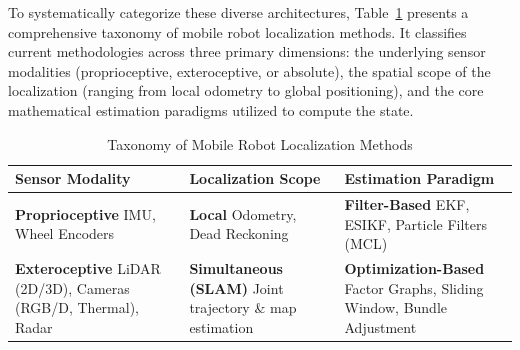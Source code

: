 \documentclass[pdflatex,sn-mathphys-num]{sn-jnl}
\theoremstyle{thmstyleone}%
\theoremstyle{thmstyletwo}%
\theoremstyle{thmstylethree}%
\begin{document}
To systematically categorize these diverse architectures, Table~\ref{classification-localization-methods} presents a comprehensive taxonomy of mobile robot localization methods. It classifies current methodologies across three primary dimensions: the underlying sensor modalities (proprioceptive, exteroceptive, or absolute), the spatial scope of the localization (ranging from local odometry to global positioning), and the core mathematical estimation paradigms utilized to compute the state.

\begin{table}[h]   
    \centering
    \caption{Taxonomy of Mobile Robot Localization Methods}
    \label{classification-localization-methods}
    \begin{tabular}{p{4cm} p{4cm} p{4cm}}
        \toprule
        \toprule
        \textbf{Sensor Modality} & 
        \textbf{Localization Scope} & 
        \textbf{Estimation Paradigm} \\ 
        \midrule
        \midrule
        
        \textbf{Proprioceptive} \newline \newline \footnotesize{IMU, \newline Wheel Encoders} 
        & 
        \textbf{Local} \newline \newline \footnotesize{Odometry, \newline Dead Reckoning}
        & 
        \textbf{Filter-Based} \newline \newline \footnotesize{EKF, ESIKF, \newline Particle Filters (MCL)} \\
        \midrule
        
        \textbf{Exteroceptive} \newline \newline \footnotesize{LiDAR (2D/3D), Cameras (RGB/D, Thermal), Radar}
        & 
        \textbf{Simultaneous (SLAM)} \newline \newline \footnotesize{Joint trajectory \& map estimation}
        & 
        \textbf{Optimization-Based} \newline \newline \footnotesize{Factor Graphs, Sliding Window, Bundle Adjustment} \\
        \midrule
        

\end{tabular}
\end{table}
\end{document}
